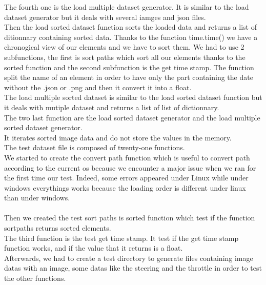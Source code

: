 \documentclass[12pt]{article}
\begin{document}
The fourth one is the load multiple dataset generator. It is similar to the load dataset generator but it deals with several iamges and json files.\\

Then the load sorted dataset function sorts the loaded data and returns a list of ditionnary containing sorted data. Thanks to the function time.time() we have a chronogical view of our elements and we have to sort them. We had to use 2 subfunctions, the first is sort paths which sort all our elements thanks to the sorted function and the second subfunction is the get time stamp. The function split the name of an element in order to have only the part containing the date without the .json or .png  and then it convert it into a float.\\


The load multiple sorted dataset is similar to the load sorted dataset function but it deals with mutiple dataset and returns a list of list of dictionnary.\\

The two last function are the load sorted dataset generator and the load multiple sorted dataset generator.\\
It iterates sorted image data and do not store the values in the memory.\\



The test dataset file is composed of twenty-one functions.\\

We started to create the convert path function which is useful to convert path according to the current os because we encounter a major issue when we ran for the first time our test. Indeed, some errors appeared under Linux while under windows everythings works because the loading order is different under linux than under windows.\\ \\

Then we created the test sort paths is sorted function which test if the function  sortpaths returns sorted elements. \\

The third function is the test get time stamp. It test if the get time stamp function works, and if the value that it returns is a float. \\


Afterwards, we had to create a test directory to generate files containing image datas with an image, some datas like the steering and the throttle in order to test the other functions. \\
\end{document}

